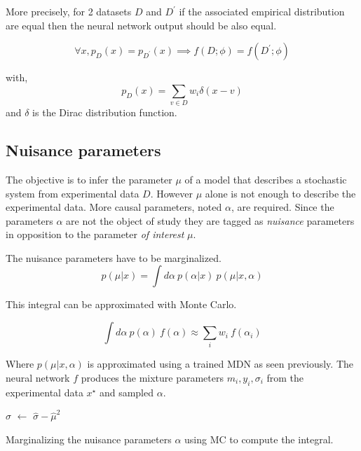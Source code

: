 More precisely, for 2 datasets $D$ and $D^\prime$ if the associated empirical distribution are equal then the neural network output should be also equal.

\begin{equation}
    \forall x, p_D(x) = p_{D^\prime}(x) \implies f(D; \phi) = f(D^\prime; \phi)
\end{equation}

with,
\begin{equation}
    p_D(x) = \sum_{v \in D} w_i \delta (x - v)
\end{equation}
and $\delta$ is the Dirac distribution function.


\subsection{Nuisance parameters}

The objective is to infer the parameter $\mu$ of a model that describes a stochastic system from experimental data $D$.
However $\mu$ alone is not enough to describe the experimental data.
More causal parameters, noted $\alpha$, are required.
Since the parameters $\alpha$ are not the object of study they are tagged as \emph{nuisance} parameters in opposition to the parameter \emph{of interest} $\mu$.

The nuisance parameters have to be marginalized.
\begin{equation}
    p(\mu | x) = \int d\alpha ~ p(\alpha | x) ~ p(\mu | x, \alpha)
\end{equation}

This integral can be approximated with Monte Carlo.

\begin{equation}
	\int d\alpha ~ p(\alpha) ~ f(\alpha)
	\approx \sum_i w_i ~ f(\alpha_i)
\end{equation}

Where $p(\mu | x, \alpha)$ is approximated using a trained MDN as seen previously.
The neural network $f$ produces the mixture parameters $m_i, y_i, \sigma_i$ from the experimental data $x^\star$ and sampled $\alpha$.

\begin{algorithm}[H]
$\hat\sigma$  $\gets$ $\hat\sigma - \hat\mu^2$ \;
\caption{Marginalizing the nuisance parameters $\alpha$ using MC to compute the integral.}
\end{algorithm}


